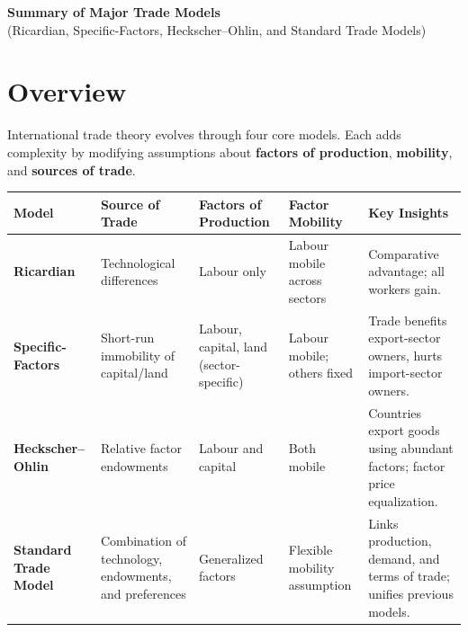 \documentclass[12pt]{article}
\begin{document}

\begin{center}
\Large \textbf{Summary of Major Trade Models} \\[4pt]
\normalsize (Ricardian, Specific-Factors, Heckscher--Ohlin, and Standard Trade Models)
\end{center}

\vspace{0.8em}

\section*{Overview}

International trade theory evolves through four core models. Each adds complexity by modifying assumptions about \textbf{factors of production}, \textbf{mobility}, and \textbf{sources of trade}.

\vspace{1em}

\begin{tabular}{>{\bfseries}p{3cm} p{3.5cm} p{2.6cm} p{2.4cm} p{3.1cm}}
\toprule
Model & Source of Trade & Factors of Production & Factor Mobility & Key Insights \\
\midrule
Ricardian & Technological differences & Labour only & Labour mobile across sectors & Comparative advantage; all workers gain. \\[3pt]

Specific-Factors & Short-run immobility of capital/land & Labour, capital, land (sector-specific) & Labour mobile; others fixed & Trade benefits export-sector owners, hurts import-sector owners. \\[3pt]

Heckscher--Ohlin & Relative factor endowments & Labour and capital & Both mobile & Countries export goods using abundant factors; factor price equalization. \\[3pt]

Standard Trade Model & Combination of technology, endowments, and preferences & Generalized factors & Flexible mobility assumption & Links production, demand, and terms of trade; unifies previous models. \\
\bottomrule
\end{tabular}

\vspace{1em}
\newpage
\end{document}
